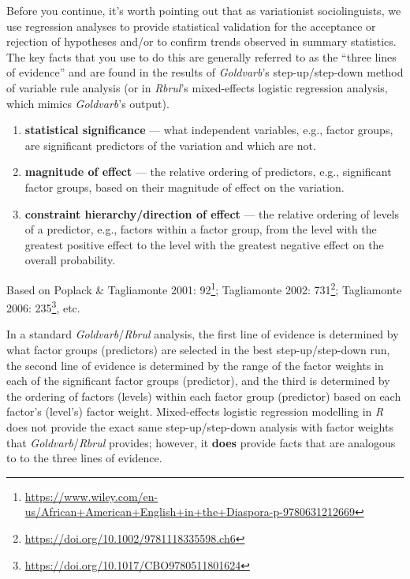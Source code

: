 \documentclass[
  10pt,
  letterpaper]{article}
\providecommand{\tightlist}{%
  \setlength{\itemsep}{0pt}\setlength{\parskip}{0pt}}\usepackage{longtable,booktabs,array}
\DeclareRobustCommand{\href}[2]{#2\footnote{\url{#1}}}
\begin{document}
Before you continue, it's worth pointing out that as variationist
sociolinguists, we use regression analyses to provide statistical
validation for the acceptance or rejection of hypotheses and/or to
confirm trends observed in summary statistics. The key facts that you
use to do this are generally referred to as the ``three lines of
evidence'' and are found in the results of \emph{Goldvarb}'s
step-up/step-down method of variable rule analysis (or in \emph{Rbrul}'s
mixed-effects logistic regression analysis, which mimics
\emph{Goldvarb}'s output).

\begin{tcolorbox}[enhanced jigsaw, colbacktitle=quarto-callout-tip-color!10!white, opacityback=0, left=2mm, breakable, bottomrule=.15mm, colback=white, colframe=quarto-callout-tip-color-frame, toprule=.15mm, arc=.35mm, rightrule=.15mm, toptitle=1mm, opacitybacktitle=0.6, bottomtitle=1mm, coltitle=black, leftrule=.75mm, titlerule=0mm, title=\textcolor{quarto-callout-tip-color}{\faLightbulb}\hspace{0.5em}{What are the Three Lines of Evidence?}]

\begin{enumerate}
\def\labelenumi{\arabic{enumi}.}
\tightlist
\item
  \textbf{statistical significance} --- what independent variables,
  e.g., factor groups, are significant predictors of the variation and
  which are not.
\item
  \textbf{magnitude of effect} --- the relative ordering of predictors,
  e.g., significant factor groups, based on their magnitude of effect on
  the variation.
\item
  \textbf{constraint hierarchy/direction of effect} --- the relative
  ordering of levels of a predictor, e.g., factors within a factor
  group, from the level with the greatest positive effect to the level
  with the greatest negative effect on the overall probability.
\end{enumerate}

Based on
\href{https://www.wiley.com/en-us/African+American+English+in+the+Diaspora-p-9780631212669}{Poplack
\& Tagliamonte 2001: 92};
\href{https://doi.org/10.1002/9781118335598.ch6}{Tagliamonte 2002: 731};
\href{https://doi.org/10.1017/CBO9780511801624}{Tagliamonte 2006: 235},
etc.

\end{tcolorbox}

In a standard \emph{Goldvarb}/\emph{Rbrul} analysis, the first line of
evidence is determined by what factor groups (predictors) are selected
in the best step-up/step-down run, the second line of evidence is
determined by the range of the factor weights in each of the significant
factor groups (predictor), and the third is determined by the ordering
of factors (levels) within each factor group (predictor) based on each
factor's (level's) factor weight. Mixed-effects logistic regression
modelling in \emph{R} does not provide the exact same step-up/step-down
analysis with factor weights that \emph{Goldvarb}/\emph{Rbrul} provides;
however, it \textbf{does} provide facts that are analogous to to the
three lines of evidence.
\end{document}

